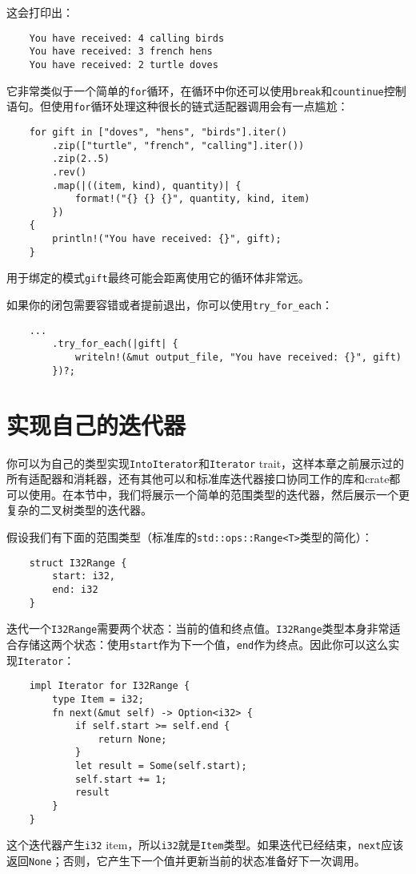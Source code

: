 这会打印出：
\begin{verbatim}
    You have received: 4 calling birds
    You have received: 3 french hens
    You have received: 2 turtle doves
\end{verbatim}

它非常类似于一个简单的\texttt{for}循环，在循环中你还可以使用\texttt{break}和\texttt{countinue}控制语句。但使用\texttt{for}循环处理这种很长的链式适配器调用会有一点尴尬：
\begin{verbatim}
    for gift in ["doves", "hens", "birds"].iter()
        .zip(["turtle", "french", "calling"].iter())
        .zip(2..5)
        .rev()
        .map(|((item, kind), quantity)| {
            format!("{} {} {}", quantity, kind, item)
        })
    {
        println!("You have received: {}", gift);
    }
\end{verbatim}

用于绑定的模式\texttt{gift}最终可能会距离使用它的循环体非常远。

如果你的闭包需要容错或者提前退出，你可以使用\texttt{try\_for\_each}：
\begin{verbatim}
    ...
        .try_for_each(|gift| {
            writeln!(&mut output_file, "You have received: {}", gift)
        })?;
\end{verbatim}

\section{实现自己的迭代器}

你可以为自己的类型实现\texttt{IntoIterator}和\texttt{Iterator} trait，这样本章之前展示过的所有适配器和消耗器，还有其他可以和标准库迭代器接口协同工作的库和crate都可以使用。在本节中，我们将展示一个简单的范围类型的迭代器，然后展示一个更复杂的二叉树类型的迭代器。

假设我们有下面的范围类型（标准库的\texttt{std::ops::Range<T>}类型的简化）：
\begin{verbatim}
    struct I32Range {
        start: i32,
        end: i32
    }
\end{verbatim}

迭代一个\texttt{I32Range}需要两个状态：当前的值和终点值。\texttt{I32Range}类型本身非常适合存储这两个状态：使用\texttt{start}作为下一个值，\texttt{end}作为终点。因此你可以这么实现\texttt{Iterator}：
\begin{verbatim}
    impl Iterator for I32Range {
        type Item = i32;
        fn next(&mut self) -> Option<i32> {
            if self.start >= self.end {
                return None;
            }
            let result = Some(self.start);
            self.start += 1;
            result
        }
    }
\end{verbatim}
这个迭代器产生\texttt{i32} item，所以\texttt{i32}就是\texttt{Item}类型。如果迭代已经结束，\texttt{next}应该返回\texttt{None}；否则，它产生下一个值并更新当前的状态准备好下一次调用。

